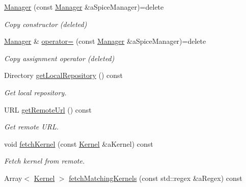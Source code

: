\begin{DoxyCompactItemize}
\item 
\hyperlink{classlibrary_1_1physics_1_1env_1_1ephem_1_1spice_1_1_manager_aa4ec6e585791cf27dfa66a3b0ced57fb}{Manager} (const \hyperlink{classlibrary_1_1physics_1_1env_1_1ephem_1_1spice_1_1_manager}{Manager} \&a\+Spice\+Manager)=delete
\begin{DoxyCompactList}\small\item\em Copy constructor (deleted) \end{DoxyCompactList}\item 
\hyperlink{classlibrary_1_1physics_1_1env_1_1ephem_1_1spice_1_1_manager}{Manager} \& \hyperlink{classlibrary_1_1physics_1_1env_1_1ephem_1_1spice_1_1_manager_a9cefb3ab334147e42eaadaa1229b0048}{operator=} (const \hyperlink{classlibrary_1_1physics_1_1env_1_1ephem_1_1spice_1_1_manager}{Manager} \&a\+Spice\+Manager)=delete
\begin{DoxyCompactList}\small\item\em Copy assignment operator (deleted) \end{DoxyCompactList}\item 
Directory \hyperlink{classlibrary_1_1physics_1_1env_1_1ephem_1_1spice_1_1_manager_a88cdb0d3353d86f1eabad722cfb8ba2b}{get\+Local\+Repository} () const
\begin{DoxyCompactList}\small\item\em Get local repository. \end{DoxyCompactList}\item 
U\+RL \hyperlink{classlibrary_1_1physics_1_1env_1_1ephem_1_1spice_1_1_manager_a583bd086060b607e617ee1676fa54f67}{get\+Remote\+Url} () const
\begin{DoxyCompactList}\small\item\em Get remote U\+RL. \end{DoxyCompactList}\item 
void \hyperlink{classlibrary_1_1physics_1_1env_1_1ephem_1_1spice_1_1_manager_a52e06b9cc1180effbd4bdd30cc488bb4}{fetch\+Kernel} (const \hyperlink{classlibrary_1_1physics_1_1env_1_1ephem_1_1spice_1_1_kernel}{Kernel} \&a\+Kernel) const
\begin{DoxyCompactList}\small\item\em Fetch kernel from remote. \end{DoxyCompactList}\item 
Array$<$ \hyperlink{classlibrary_1_1physics_1_1env_1_1ephem_1_1spice_1_1_kernel}{Kernel} $>$ \hyperlink{classlibrary_1_1physics_1_1env_1_1ephem_1_1spice_1_1_manager_ac6f9fa45224f6f1116e66ae2c32e3e65}{fetch\+Matching\+Kernels} (const std\+::regex \&a\+Regex) const

\end{DoxyCompactItemize}
